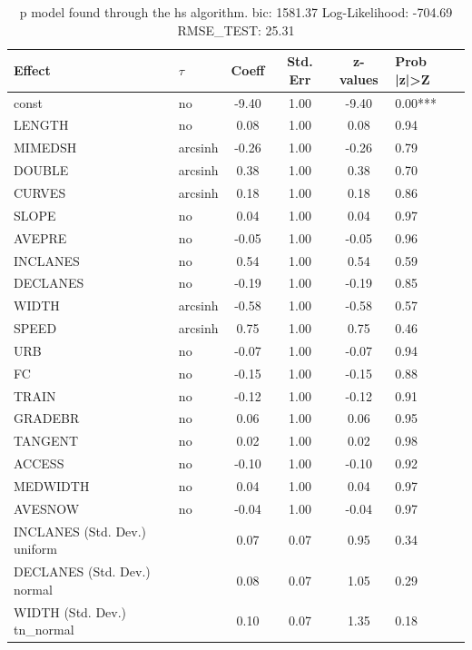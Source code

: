 \begin{table}
	\caption{p model found through the hs algorithm. bic: 1581.37 Log-Likelihood: -704.69 RMSE_TEST: 25.31}
	\begin{center}
		\begin{tabular}{|l|l|c|c|c|l|}
			\hline
			Effect & $\tau$ & Coeff & Std. Err & z-values & Prob |z|>Z \\
			\hline
			const & no & -9.40 & 1.00 & -9.40 & 0.00*** \\
			\hline
			LENGTH & no & 0.08 & 1.00 & 0.08 & 0.94 \\
			\hline
			MIMEDSH & arcsinh & -0.26 & 1.00 & -0.26 & 0.79 \\
			\hline
			DOUBLE & arcsinh & 0.38 & 1.00 & 0.38 & 0.70 \\
			\hline
			CURVES & arcsinh & 0.18 & 1.00 & 0.18 & 0.86 \\
			\hline
			SLOPE & no & 0.04 & 1.00 & 0.04 & 0.97 \\
			\hline
			AVEPRE & no & -0.05 & 1.00 & -0.05 & 0.96 \\
			\hline
			INCLANES & no & 0.54 & 1.00 & 0.54 & 0.59 \\
			\hline
			DECLANES & no & -0.19 & 1.00 & -0.19 & 0.85 \\
			\hline
			WIDTH & arcsinh & -0.58 & 1.00 & -0.58 & 0.57 \\
			\hline
			SPEED & arcsinh & 0.75 & 1.00 & 0.75 & 0.46 \\
			\hline
			URB & no & -0.07 & 1.00 & -0.07 & 0.94 \\
			\hline
			FC & no & -0.15 & 1.00 & -0.15 & 0.88 \\
			\hline
			TRAIN & no & -0.12 & 1.00 & -0.12 & 0.91 \\
			\hline
			GRADEBR & no & 0.06 & 1.00 & 0.06 & 0.95 \\
			\hline
			TANGENT & no & 0.02 & 1.00 & 0.02 & 0.98 \\
			\hline
			ACCESS & no & -0.10 & 1.00 & -0.10 & 0.92 \\
			\hline
			MEDWIDTH & no & 0.04 & 1.00 & 0.04 & 0.97 \\
			\hline
			AVESNOW & no & -0.04 & 1.00 & -0.04 & 0.97 \\
			\hline
			INCLANES (Std. Dev.) uniform &  & 0.07 & 0.07 & 0.95 & 0.34 \\
			\hline
			DECLANES (Std. Dev.) normal &  & 0.08 & 0.07 & 1.05 & 0.29 \\
			\hline
			WIDTH (Std. Dev.) tn_normal &  & 0.10 & 0.07 & 1.35 & 0.18 \\

\end{tabular}
\end{center}
\end{table}
